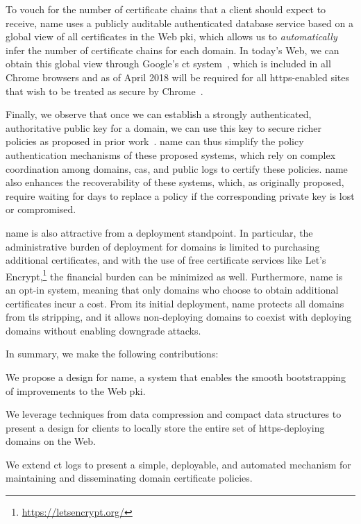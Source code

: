 To vouch for the number of certificate chains that a client should expect to
receive, \ac{name} uses a publicly auditable authenticated database service
based on a global view of all certificates in the Web \ac{pki}, which allows us
to \emph{automatically} infer the number of certificate chains for each domain.
In today's Web, we can obtain this global view through Google's \ac{ct}
system~\cite{rfc6962}, which is included in all Chrome browsers and as of April
2018 will be required for all \ac{https}-enabled sites that wish to be treated
as secure by Chrome~\cite{sleevi2016requiring}.

Finally, we observe that once we can establish a strongly authenticated,
authoritative public key for a domain, we can use this key to secure richer
policies as proposed in prior work~\cite{basin2014arpki,
szalachowski2014policert}. \ac{name} can thus simplify the policy authentication
mechanisms of these proposed systems, which rely on complex coordination among
domains, \acp{ca}, and public logs to certify these policies. \ac{name} also
enhances the recoverability of these systems, which, as originally proposed,
require waiting for days to replace a policy if the corresponding private key is
lost or compromised.

\ac{name} is also attractive from a deployment standpoint. In particular, the
administrative burden of deployment for domains is limited to purchasing
additional certificates, and with the use of free certificate services like
Let's Encrypt,\footnote{\url{https://letsencrypt.org/}} the financial burden can
be minimized as well. Furthermore, \ac{name} is an opt-in system, meaning that
only domains who choose to obtain additional certificates incur a cost. From its
initial deployment, \ac{name} protects all domains from \ac{tls} stripping, and
it allows non-deploying domains to coexist with deploying domains without
enabling downgrade attacks.

In summary, we make the following contributions:
\begin{compactitem}
\item We propose a design for \ac{name}, a system that enables the smooth
  bootstrapping of improvements to the Web \ac{pki}.
\item We leverage techniques from data compression and compact data structures
  to present a design for clients to locally store the entire set of
  \ac{https}-deploying domains on the Web.
\item We extend \ac{ct} logs to present a simple, deployable, and automated
  mechanism for maintaining and disseminating domain certificate policies.
\end{compactitem}


